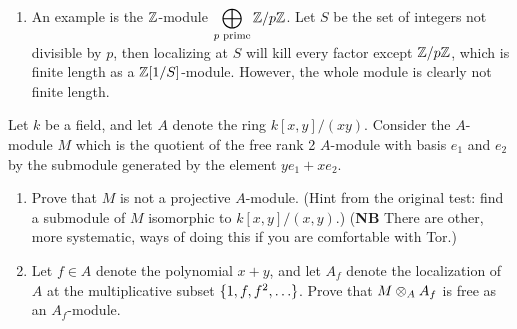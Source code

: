 \begin{solution}
\begin{enumerate}
    \item An example is the $\mathbb{Z}$-module $\displaystyle \bigoplus_{p \text{ prime}} \mathbb{Z}/p\mathbb{Z}$. Let $S$ be the set of integers not divisible by $p$, then localizing at $S$ will kill every factor except $\mathbb{Z}/p\mathbb{Z}$, which is finite length as a $\mathbb{Z}[1/S]$-module. However, the whole module is clearly not finite length.
\end{enumerate}
\end{solution}

\begin{question}[subtitle = August 2024 Problem 2,ID=Aug24_2]
Let $k$ be a field, and let $A$ denote the ring $k[x,y]/(xy)$. Consider the $A$-module $M$ which is the quotient of the free rank 2 $A$-module with basis $e_1$ and $e_2$ by the submodule generated by the element $ye_1+xe_2$.
\begin{enumerate}
    \item Prove that $M$ is not a projective $A$-module. (Hint from the original test: find a submodule of $M$ isomorphic to $k[x,y]/(x,y)$.) (\textbf{NB} There are other, more systematic, ways of doing this if you are comfortable with Tor.)
    \item Let $f \in A$ denote the polynomial $x+y$, and let $A_f$ denote the localization of $A$ at the multiplicative subset $\set{1,f,f^2,\dots}$. Prove that $M \otimes_A A_f$ is free as an $A_f$-module.
\end{enumerate}
\end{question}
